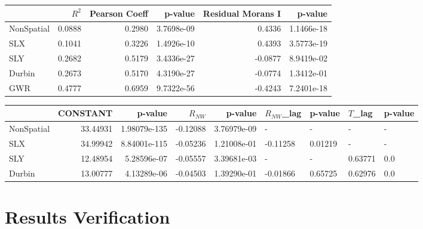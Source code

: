 \documentclass[article,12pt]{article}
\numberwithin{equation}{section}
\begin{document}
\begin{tabular}{lrrrrr}
	\hline
	{} &     $R^2$ &  Pearson Coeff &     p-value &  Residual Morans I &     p-value \\
	\hline
	NonSpatial &  0.0888 &         0.2980 &  3.7698e-09 &             0.4336 &  1.1466e-18 \\
	SLX        &  0.1041 &         0.3226 &  1.4926e-10 &             0.4393 &  3.5773e-19 \\
	SLY        &  0.2682 &         0.5179 &  3.4336e-27 &            -0.0877 &  8.9419e-02 \\
	Durbin     &  0.2673 &         0.5170 &  4.3190e-27 &            -0.0774 &  1.3412e-01 \\
	GWR        &  0.4777 &         0.6959 &  9.7322e-56 &            -0.4243 &  7.2401e-18 \\
	\hline
\end{tabular}
\vspace{.2in}
\begin{adjustwidth}{-.55in}{}
	\begin{tabular}{lrrrrllll}
		\hline
		{} &  CONSTANT &       p-value &  $R_{NW}$ &      p-value & $R_{NW}$\_lag &  p-value & $T$\_lag & p-value \\
		\hline
		NonSpatial &  33.44931 &  1.98079e-135 &      -0.12088 &  3.76979e-09 &                - &        - &              - &       - \\
		SLX        &  34.99942 &  8.84001e-115 &      -0.05236 &  1.21008e-01 &         -0.11258 &  0.01219 &              - &       - \\
		SLY        &  12.48954 &   5.28596e-07 &      -0.05557 &  3.39681e-03 &                - &        - &        0.63771 &     0.0 \\
		Durbin     &  13.00777 &   4.13289e-06 &      -0.04503 &  1.39290e-01 &         -0.01866 &  0.65725 &        0.62976 &     0.0 \\
		\hline
	\end{tabular}
	
\end{adjustwidth}



\section*{Results Verification}
\end{document}
